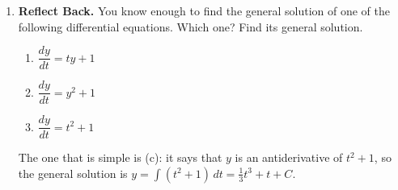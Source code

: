 \documentclass{article}
\begin{document}
\begin{enumerate}
\begin{enumerate}

  \end{enumerate}

\item 

 \textbf{Reflect Back.}
You know
  enough to find the general solution of one of the following differential
  equations.  Which one?  Find its general solution.

  
    \begin{enumerate}
    \item $\dfrac{dy}{dt} = ty + 1$
    \item $\dfrac{dy}{dt} = y^2 + 1$
    \item
$\dfrac{dy}{dt} = t^2 + 1$
    \end{enumerate}    

    \pspace{\vfill}
  

  \begin{solution}
    The one that is simple is {{(c)}}: it
    says that $y$ is an antiderivative of $t^2 + 1$, so the general
    solution is $y = \displaystyle \int (t^2 + 1)\,dt = \boxed{\frac{1}{3}
      t^3 + t + C}$.
  \end{solution}  

\end{enumerate}
\end{document}
